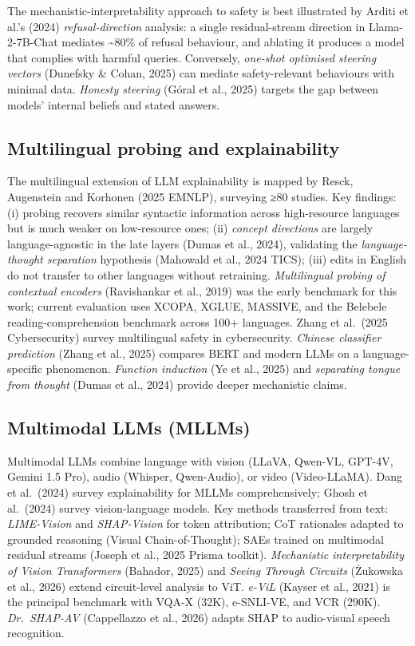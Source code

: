The mechanistic-interpretability approach to safety is best illustrated by Arditi et al.'s (2024) \emph{refusal-direction} analysis: a single residual-stream direction in Llama-2-7B-Chat mediates \textasciitilde80\% of refusal behaviour, and ablating it produces a model that complies with harmful queries. Conversely, \emph{one-shot optimised steering vectors} (Dunefsky \& Cohan, 2025) can mediate safety-relevant behaviours with minimal data. \emph{Honesty steering} (Góral et al., 2025) targets the gap between models' internal beliefs and stated answers.

\subsection{Multilingual probing and explainability}\label{multilingual-probing-and-explainability}

The multilingual extension of LLM explainability is mapped by Resck, Augenstein and Korhonen (2025 EMNLP), surveying ≥80 studies. Key findings: (i) probing recovers similar syntactic information across high-resource languages but is much weaker on low-resource ones; (ii) \emph{concept directions} are largely language-agnostic in the late layers (Dumas et al., 2024), validating the \emph{language-thought separation} hypothesis (Mahowald et al., 2024 TICS); (iii) edits in English do not transfer to other languages without retraining. \emph{Multilingual probing of contextual encoders} (Ravishankar et al., 2019) was the early benchmark for this work; current evaluation uses XCOPA, XGLUE, MASSIVE, and the Belebele reading-comprehension benchmark across 100+ languages. Zhang et al.~(2025 Cybersecurity) survey multilingual safety in cybersecurity. \emph{Chinese classifier prediction} (Zhang et al., 2025) compares BERT and modern LLMs on a language-specific phenomenon. \emph{Function induction} (Ye et al., 2025) and \emph{separating tongue from thought} (Dumas et al., 2024) provide deeper mechanistic claims.

\subsection{Multimodal LLMs (MLLMs)}\label{multimodal-llms-mllms}

Multimodal LLMs combine language with vision (LLaVA, Qwen-VL, GPT-4V, Gemini 1.5 Pro), audio (Whisper, Qwen-Audio), or video (Video-LLaMA). Dang et al.~(2024) survey explainability for MLLMs comprehensively; Ghosh et al.~(2024) survey vision-language models. Key methods transferred from text: \emph{LIME-Vision} and \emph{SHAP-Vision} for token attribution; CoT rationales adapted to grounded reasoning (Visual Chain-of-Thought); SAEs trained on multimodal residual streams (Joseph et al., 2025 Prisma toolkit). \emph{Mechanistic interpretability of Vision Transformers} (Bahador, 2025) and \emph{Seeing Through Circuits} (Żukowska et al., 2026) extend circuit-level analysis to ViT. \emph{e-ViL} (Kayser et al., 2021) is the principal benchmark with VQA-X (32K), e-SNLI-VE, and VCR (290K). \emph{Dr.~SHAP-AV} (Cappellazzo et al., 2026) adapts SHAP to audio-visual speech recognition.

